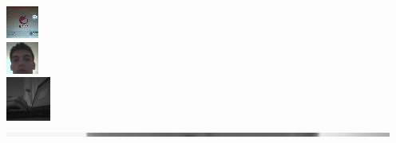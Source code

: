 \documentclass{beamer}
\begin{document}
\begin{frame}
\begin{columns}
        \begin{column}[c]{.3\textwidth}
            \begin{center}
                \hspace{-2cm}\includegraphics{fotka1.jpg}\\
                \vspace{0.3cm}
                \hspace{-2cm}\includegraphics{fotka2.jpg}\\
                \vspace{0.3cm}
                \hspace{-2cm}\includegraphics{fotka3.jpg}\\
                \vspace{0.3cm}
                \hspace{-2cm}\includegraphics[scale=0.4]{fotka4.jpg}
            \end{center}
        \end{column}
    \end{columns}
\end{frame}
\end{document}
